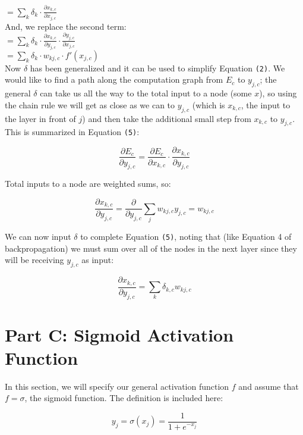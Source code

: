 \documentclass[conference]{IEEEtran}
\newcommand{\dd}[2]{\frac{\partial #1}{\partial #2}} %
\begin{document}
$= \sum_{k} \delta_{k} \cdot \dd{x_{k, c}}{x_{j, c}}$ \\

And, we replace the second term: \\

$= \sum_{k} \delta_{k} \cdot \dd{x_{k, c}}{y_{j, c}} \cdot \dd{y_{j,c}}{x_{j,c}}$ \\

$= \sum_{k} \delta_{k} \cdot w_{kj, c} \cdot f'(x_{j, c})$ \\

Now $\delta$ has been generalized and it can be used to simplify Equation \verb+(2)+. We would like to find a path along the computation graph from $E_{c}$ to $y_{j,c}$; the general $\delta$ can take us all the way to the total input to a node (some $x$), so using the chain rule we will get as close as we can to $y_{j,c}$ (which is $x_{k,c}$, the input to the layer in front of $j$) and then take the additional small step from $x_{k, c}$ to $y_{j, c}$. This is summarized in Equation \verb+(5)+:

\begin{equation}
\dd{E_{c}}{y_{j,c}} = \dd{E_{c}}{x_{k,c}} \cdot \dd{x_{k,c}}{y_{j,c}}
\end{equation}

Total inputs to a node are weighted sums, so:

\begin{equation}
\dd{x_{k,c}}{y_{j,c}} = \dd{}{y_{j,c}} \sum_{j}w_{kj,c}y_{j,c} = w_{kj,c}
\end{equation}

We can now input $\delta$ to complete Equation \verb+(5)+, noting that (like Equation 4 of backpropagation) we must sum over all of the nodes in the next layer since they will be receiving $y_{j,c}$ as input:

\begin{equation}
\dd{x_{k,c}}{y_{j,c}} = \sum_{k}\delta_{k,c}w_{kj,c}
\end{equation}

\section{Part C: Sigmoid Activation Function}

In this section, we will specify our general activation function $f$ and assume that $f = \sigma$, the sigmoid function. The definition is included here:

\begin{equation}
y_{j} = \sigma(x_{j}) = \frac{1}{1 + e^{-x_{j}}}
\end{equation}
\end{document}

